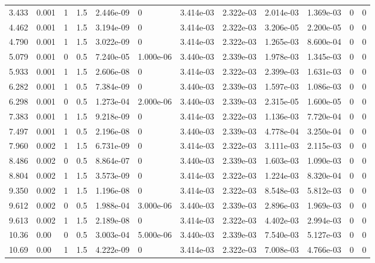 \documentclass[preview]{standalone}
\begin{document}
{{\begin{tabular}{L{1.2cm}C{1.2cm} C{0.3cm}C{0.5cm} C{1.4cm}C{1.4cm} C{1.4cm}C{1.4cm} C{1.6cm}C{1.6cm} C{1.6cm}C{1.6cm}}
  3.433  &  0.001  & 1     & 1.5 &  2.446e-09  & 0  &  3.414e-03&   2.322e-03& 2.014e-03 & 1.369e-03   &  0 & 0  \\ 
  4.462  &  0.001  & 1     & 1.5 &  3.194e-09  & 0  &  3.414e-03&   2.322e-03& 3.206e-05 & 2.200e-05   &  0 & 0  \\ 
  4.790  &  0.001  & 1     & 1.5 &  3.022e-09  & 0  &  3.414e-03&   2.322e-03& 1.265e-03 & 8.600e-04   &  0 & 0  \\ 
  5.079  &  0.001  & 0     & 0.5 &  7.240e-05  & 1.000e-06  &  3.440e-03&   2.339e-03& 1.978e-03 & 1.345e-03   &  0 & 0  \\ 
  5.933  &  0.001  & 1     & 1.5 &  2.606e-08  & 0  &  3.414e-03&   2.322e-03& 2.399e-03 & 1.631e-03   &  0 & 0  \\ 
  6.282  &  0.001  & 1     & 0.5 &  7.384e-09  & 0  &  3.440e-03&   2.339e-03& 1.597e-03 & 1.086e-03   &  0 & 0  \\ 
  6.298  &  0.001  & 0     & 0.5 &  1.273e-04  & 2.000e-06  &  3.440e-03&   2.339e-03& 2.315e-05 & 1.600e-05   &  0 & 0  \\ 
  7.383  &  0.001  & 1     & 1.5 &  9.218e-09  & 0  &  3.414e-03&   2.322e-03& 1.136e-03 & 7.720e-04   &  0 & 0  \\ 
  7.497  &  0.001  & 1     & 0.5 &  2.196e-08  & 0  &  3.440e-03&   2.339e-03& 4.778e-04 & 3.250e-04   &  0 & 0  \\ 
  7.960  &  0.002  & 1     & 1.5 &  6.731e-09  & 0  &  3.414e-03&   2.322e-03& 3.111e-03 & 2.115e-03   &  0 & 0  \\ 
  8.486  &  0.002  & 0     & 0.5 &  8.864e-07  & 0  &  3.440e-03&   2.339e-03& 1.603e-03 & 1.090e-03   &  0 & 0  \\ 
  8.804  &  0.002  & 1     & 1.5 &  3.573e-09  & 0  &  3.414e-03&   2.322e-03& 1.224e-03 & 8.320e-04   &  0 & 0  \\ 
  9.350  &  0.002  & 1     & 1.5 &  1.196e-08  & 0  &  3.414e-03&   2.322e-03& 8.548e-03 & 5.812e-03   &  0 & 0  \\ 
  9.612  &  0.002  & 0     & 0.5 &  1.988e-04  & 3.000e-06  &  3.440e-03&   2.339e-03& 2.896e-03 & 1.969e-03   &  0 & 0  \\ 
  9.613  &  0.002  & 1     & 1.5 &  2.189e-08  & 0  &  3.414e-03&   2.322e-03& 4.402e-03 & 2.994e-03   &  0 & 0  \\ 
  10.36  &  0.00  & 0     & 0.5 &  3.003e-04  & 5.000e-06  &  3.440e-03&   2.339e-03& 7.540e-03 & 5.127e-03   &  0 & 0  \\ 
  10.69  &  0.00  & 1     & 1.5 &  4.222e-09  & 0  &  3.414e-03&   2.322e-03& 7.008e-03 & 4.766e-03   &  0 & 0  \\ 

\end{tabular}}}
\end{document}
